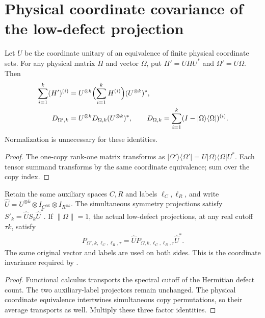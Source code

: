 \section{Physical coordinate covariance of the low-defect projection}
\label{sec:replica_low_defect_coordinate_covariance}

\begin{theorem}
\label{thm:replica_physical_operator_coordinate_covariance}
\leanok
Let $U$ be the coordinate unitary of an equivalence of finite physical
coordinate sets. For any physical matrix $H$ and vector $\Omega$, put
$H'=UHU^*$ and $\Omega'=U\Omega$. Then
\begin{align}
 \sum_{i=1}^k(H')^{(i)}
   &=U^{\otimes k}\Bigl(\sum_{i=1}^kH^{(i)}\Bigr)(U^{\otimes k})^*,\\
 D_{\Omega',k}
   &=U^{\otimes k}D_{\Omega,k}(U^{\otimes k})^*,
 \qquad
 D_{\Omega,k}=\sum_{i=1}^k(I-|\Omega\rangle\langle\Omega|)^{(i)}.
\end{align}
Normalization is unnecessary for these identities.
\end{theorem}
\begin{proof}
\leanok
The one-copy rank-one matrix transforms as
$|\Omega'\rangle\langle\Omega'|=U|\Omega\rangle\langle\Omega|U^*$.
Each tensor summand transforms by the same coordinate equivalence;
sum over the copy index.
\end{proof}

\begin{theorem}
\label{thm:replica_low_defect_coordinate_covariance}
\leanok
Retain the same auxiliary spaces $C,R$ and labels $\ell_C,\ell_R$,
and write $\widehat U=U^{\otimes k}\otimes I_{C^{\otimes k}}\otimes I_{R^{\otimes k}}$.
The simultaneous symmetry projections satisfy
$S'_k=\widehat U S_k\widehat U^*$.
If $\|\Omega\|=1$, the actual low-defect projections, at any real
cutoff $\tau k$, satisfy
\begin{align}
 P_{\Omega',k,\ell_C,\ell_R,\tau}
   =\widehat U P_{\Omega,k,\ell_C,\ell_R,\tau}\widehat U^*.
\end{align}
The same original vector and labels are used on both sides.
This is the coordinate invariance required by
\cite[Section~8, lines~421--456 and~603--615]{OpenAI2026AreaLaw}.
\end{theorem}
\begin{proof}
\leanok
{}
Functional calculus transports the spectral cutoff of the Hermitian
defect count. The two auxiliary-label projectors remain unchanged.
The physical coordinate equivalence intertwines simultaneous copy
permutations, so their average transports as well. Multiply these three
factor identities.
\end{proof}
